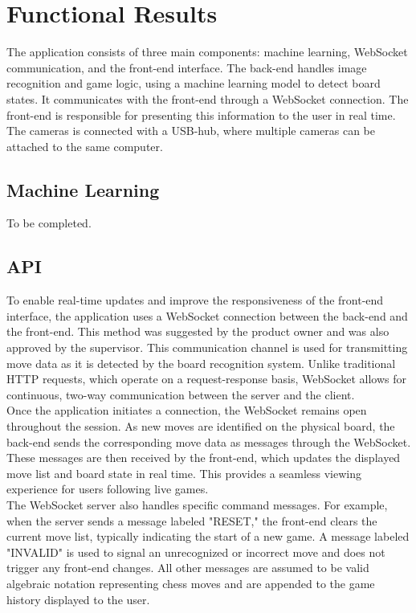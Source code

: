 \section{Functional Results}
The application consists of three main components: machine learning, WebSocket communication, and the front-end interface. The back-end handles image recognition and game logic, using a machine learning model to detect board states. It communicates with the front-end through a WebSocket connection. The front-end is responsible for presenting this information to the user in real time. The cameras is connected with a USB-hub, where multiple cameras can be attached to the same computer. 

\subsection{Machine Learning}
To be completed.

\subsection{API}
To enable real-time updates and improve the responsiveness of the front-end interface, the application uses a WebSocket connection between the back-end and the front-end. This method was suggested by the product owner and was also approved by the supervisor. This communication channel is used for transmitting move data as it is detected by the board recognition system. Unlike traditional HTTP requests, which operate on a request-response basis, WebSocket allows for continuous, two-way communication between the server and the client. \\

Once the application initiates a connection, the WebSocket remains open throughout the session. As new moves are identified on the physical board, the back-end sends the corresponding move data as messages through the WebSocket. These messages are then received by the front-end, which updates the displayed move list and board state in real time. This provides a seamless viewing experience for users following live games. \\

The WebSocket server also handles specific command messages. For example, when the server sends a message labeled "RESET," the front-end clears the current move list, typically indicating the start of a new game. A message labeled "INVALID" is used to signal an unrecognized or incorrect move and does not trigger any front-end changes. All other messages are assumed to be valid algebraic notation representing chess moves and are appended to the game history displayed to the user. \\

